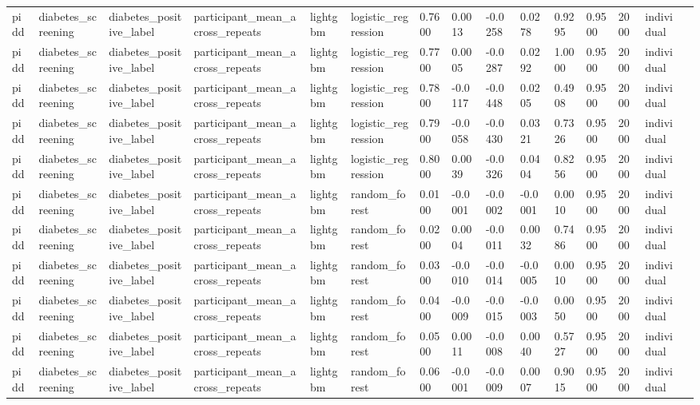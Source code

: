 \begin{tabular}{lllllllllllllll}
pidd & diabetes\_screening & diabetes\_positive\_label & participant\_mean\_across\_repeats & lightgbm & logistic\_regression & 0.7600 & 0.0013 & -0.0258 & 0.0278 & 0.9295 & 0.9500 & 2000 & individual &  \\
pidd & diabetes\_screening & diabetes\_positive\_label & participant\_mean\_across\_repeats & lightgbm & logistic\_regression & 0.7700 & 0.0005 & -0.0287 & 0.0292 & 1.0000 & 0.9500 & 2000 & individual &  \\
pidd & diabetes\_screening & diabetes\_positive\_label & participant\_mean\_across\_repeats & lightgbm & logistic\_regression & 0.7800 & -0.0117 & -0.0448 & 0.0205 & 0.4908 & 0.9500 & 2000 & individual &  \\
pidd & diabetes\_screening & diabetes\_positive\_label & participant\_mean\_across\_repeats & lightgbm & logistic\_regression & 0.7900 & -0.0058 & -0.0430 & 0.0321 & 0.7326 & 0.9500 & 2000 & individual &  \\
pidd & diabetes\_screening & diabetes\_positive\_label & participant\_mean\_across\_repeats & lightgbm & logistic\_regression & 0.8000 & 0.0039 & -0.0326 & 0.0404 & 0.8256 & 0.9500 & 2000 & individual &  \\
pidd & diabetes\_screening & diabetes\_positive\_label & participant\_mean\_across\_repeats & lightgbm & random\_forest & 0.0100 & -0.0001 & -0.0002 & -0.0001 & 0.0010 & 0.9500 & 2000 & individual &  \\
pidd & diabetes\_screening & diabetes\_positive\_label & participant\_mean\_across\_repeats & lightgbm & random\_forest & 0.0200 & 0.0004 & -0.0011 & 0.0032 & 0.7486 & 0.9500 & 2000 & individual &  \\
pidd & diabetes\_screening & diabetes\_positive\_label & participant\_mean\_across\_repeats & lightgbm & random\_forest & 0.0300 & -0.0010 & -0.0014 & -0.0005 & 0.0010 & 0.9500 & 2000 & individual &  \\
pidd & diabetes\_screening & diabetes\_positive\_label & participant\_mean\_across\_repeats & lightgbm & random\_forest & 0.0400 & -0.0009 & -0.0015 & -0.0003 & 0.0050 & 0.9500 & 2000 & individual &  \\
pidd & diabetes\_screening & diabetes\_positive\_label & participant\_mean\_across\_repeats & lightgbm & random\_forest & 0.0500 & 0.0011 & -0.0008 & 0.0040 & 0.5727 & 0.9500 & 2000 & individual &  \\
pidd & diabetes\_screening & diabetes\_positive\_label & participant\_mean\_across\_repeats & lightgbm & random\_forest & 0.0600 & -0.0001 & -0.0009 & 0.0007 & 0.9015 & 0.9500 & 2000 & individual &  \\

\end{tabular}
